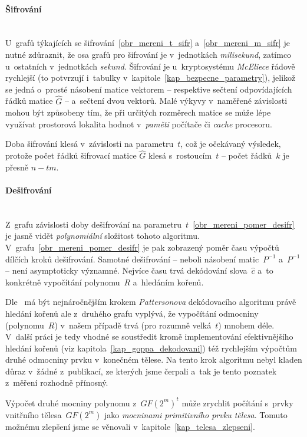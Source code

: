 \documentclass[thesis=M,czech,hidelinks]{FITthesis}[2012/06/26]
\newcommand{\0}{{\textcolor[gray]{0.75}{0}}}
\begin{document}
\paragraph{Šifrování} \hfill \\
U~grafů týkajících se šifrování~\ref{obr_mereni_t_sifr}
a~\ref{obr_mereni_m_sifr} je nutné zdůraznit, že osa grafů pro šifrování je
v~jednotkách \emph{milisekund}, zatímco u~ostatních v~jednotkách \emph{sekund}.
Šifrování je u~kryptosystému \emph{McEliece} řádově rychlejší (to potvrzují
i~tabulky v~kapitole~\ref{kap_bezpecne_parametry}), jelikož se jedná o~prosté
násobení matice vektorem -- respektive sečtení odpovídajících řádků matice
$\hat{G}$ -- a~sečtení dvou vektorů. Malé výkyvy v~naměřené závislosti mohou být
způsobeny tím, že při určitých rozměrech matice se může lépe využívat prostorová
lokalita hodnot v~\emph{paměti} počítače či \emph{cache} procesoru.

Doba šifrování klesá v~závislosti na parametru~$t$, což je očekávaný výsledek,
protože počet řádků šifrovací matice $\hat{G}$ klesá s~rostoucím~$t$ -- počet
řádků~$k$ je přesně $n - tm$.

\paragraph{Dešifrování} \hfill \\
Z~grafu závislosti doby dešifrování na
parametru~$t$~\ref{obr_mereni_pomer_desifr} je jasně vidět \emph{polynomiální}
složitost tohoto algoritmu. V~grafu~\ref{obr_mereni_pomer_desifr} je pak
zobrazený poměr času výpočtů dílčích kroků dešifrování. Samotné dešifrování --
neboli násobení matic~$P^{-1}$ a~$P^{-1}$ -- není asymptoticky významné. Nejvíce
času trvá dekódování slova~$\hat{c}$ a~to konkrétně vypočítání polynomu~$R$
a~hledáním kořenů.

Dle~\cite{Engelbert} má být nejnáročnějším krokem \emph{Pattersonova}
dekódovacího algoritmu právě hledání kořenů ale z~druhého grafu vyplývá, že
vypočítání odmocniny (polynomu~$R$) v~našem případě trvá (pro rozumně velká~$t$)
mnohem déle. V~další práci je tedy vhodné se soustředit kromě implementování
efektivnějšího hledání kořenů (viz kapitola~\ref{kap_goppa_dekodovani}) též
rychlejším výpočtům druhé odmocniny prvku v~konečném tělese. Na tento krok
algoritmu nebyl kladen důraz v~žádné z~publikací, ze kterých jsme čerpali a~tak
je tento poznatek z~měření rozhodně přínosný.

Výpočet druhé mocniny polynomu z~$GF(2^m)^t$ může zrychlit počítání s~prvky
vnitřního tělesa~$GF(2^m)$ jako \emph{mocninami primitivního prvku tělesa}.
Tomuto možnému zlepšení jsme se věnovali v~kapitole~\ref{kap_telesa_zlepseni}.
\end{document}
